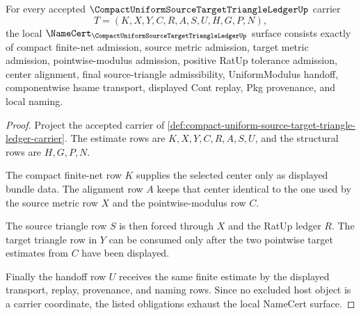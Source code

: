 \begin{theorem}
\label{thm:compact-uniform-source-target-triangle-ledger-namecert-obligations}
For every accepted $\CompactUniformSourceTargetTriangleLedgerUp$ carrier
$$
T=(K,X,Y,C,R,A,S,U,H,G,P,N),
$$
the local $\NameCert_{\CompactUniformSourceTargetTriangleLedgerUp}$ surface
consists exactly of compact finite-net admission, source metric admission,
target metric admission, pointwise-modulus admission, positive RatUp tolerance
admission, center alignment, final source-triangle admissibility,
UniformModulus handoff, componentwise hsame transport, displayed Cont replay,
Pkg provenance, and local naming.
\end{theorem}
\begin{proof}
Project the accepted carrier of
\autoref{def:compact-uniform-source-target-triangle-ledger-carrier}. The
estimate rows are $K,X,Y,C,R,A,S,U$, and the structural rows are $H,G,P,N$.

The compact finite-net row $K$ supplies the selected center only as displayed
bundle data. The alignment row $A$ keeps that center identical to the one used
by the source metric row $X$ and the pointwise-modulus row $C$.

The source triangle row $S$ is then forced through $X$ and the RatUp ledger
$R$. The target triangle row in $Y$ can be consumed only after the two
pointwise target estimates from $C$ have been displayed.

Finally the handoff row $U$ receives the same finite estimate by the displayed
transport, replay, provenance, and naming rows. Since no excluded host object
is a carrier coordinate, the listed obligations exhaust the local NameCert
surface.
\end{proof}

